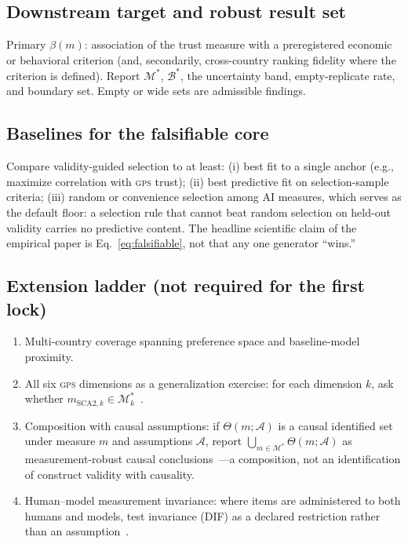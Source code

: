 \documentclass[10pt,letterpaper]{article}
\newcommand{\GPS}{\textsc{gps}}
\newcommand{\M}{\ensuremath{\mathcal{M}}}
\newcommand{\Bset}{\mathcal{B}}
\begin{document}
\subsection{Downstream target and robust result set}
Primary $\beta(m)$: association of the trust measure with a preregistered economic or behavioral criterion (and, secondarily, cross-country ranking fidelity where the criterion is defined).
Report $\M^*$, $\Bset^*$, the uncertainty band, empty-replicate rate, and boundary set.
Empty or wide sets are admissible findings.

\subsection{Baselines for the falsifiable core}
Compare validity-guided selection to at least:
(i) best fit to a single anchor (e.g., maximize correlation with \GPS{} trust);
(ii) best predictive fit on selection-sample criteria;
(iii) random or convenience selection among AI measures, which serves as the default floor: a selection rule that cannot beat random selection on held-out validity carries no predictive content.
The headline scientific claim of the empirical paper is Eq.~\eqref{eq:falsifiable}, not that any one generator ``wins.''

\subsection{Extension ladder (not required for the first lock)}
\begin{enumerate}
\item Multi-country coverage spanning preference space and baseline-model proximity.
\item All six \GPS{} dimensions as a generalization exercise: for each dimension $k$, ask whether $m_{\mathrm{SCA2},k}\in\M^*_k$~\cite{falk2018}.
\item Composition with causal assumptions: if $\Theta(m;\mathcal{A})$ is a causal identified set under measure $m$ and assumptions $\mathcal{A}$, report $\bigcup_{m\in\M^*}\Theta(m;\mathcal{A})$ as measurement-robust causal conclusions~\cite{manning2024}---a composition, not an identification of construct validity with causality.
\item Human--model measurement invariance: where items are administered to both humans and models, test invariance (DIF) as a declared restriction rather than an assumption~\cite{zeinfeld2026}.
\end{enumerate}
\end{document}
